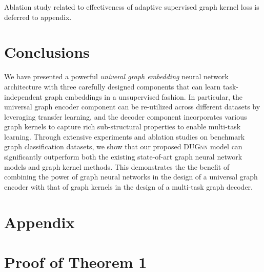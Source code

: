 \documentclass{article}
\begin{document}
Ablation study related to effectiveness of adaptive supervised graph kernel loss is deferred to appendix.


























 


\section{Conclusions}\label{sec:conclusion}

We have presented a   powerful {\em univeral graph embedding} neural network  architecture with three carefully designed components that can learn task-independent graph embeddings in a unsupervised fashion. In particular, the universal graph encoder component can be re-utilized across different datasets by leveraging transfer learning, and the  decoder component incorporates various  graph kernels to  capture   rich sub-structural properties to enable multi-task learning. 
Through extensive experiments and ablation studies on benchmark  graph classification datasets, we show that our proposed \textsc{DUGnn}  model can significantly outperform both the existing state-of-art graph neural network models and graph kernel methods. This demonstrates the  
the benefit of combining the power of graph neural networks in the design of a universal graph encoder with that of graph kernels in the design of a multi-task graph decoder. 






\setlength{\bibsep}{0pt}
\medskip
\small




\section{Appendix}



\section{Proof of Theorem 1}
\end{document}

